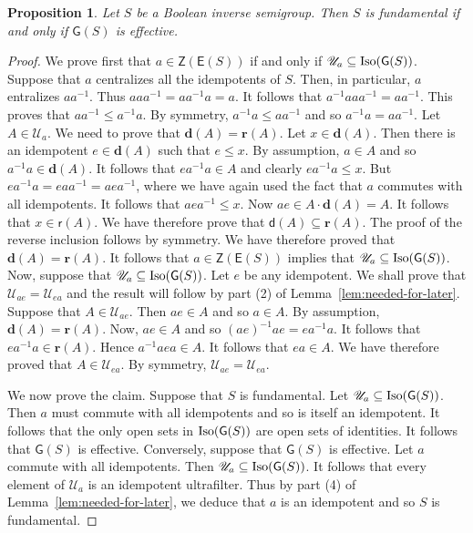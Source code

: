 \documentclass[a4paper]{amsart}
\newtheorem{proposition}[theorem]{Proposition}
\begin{document}
\begin{proposition}\label{prop:effective} Let $S$ be a Boolean inverse semigroup.
Then $S$ is fundamental if and only if $\mathsf{G}(S)$ is effective.
\end{proposition}
\begin{proof} We prove first that $a \in \mathsf{Z}(\mathsf{E}(S))$ if and only if 
$\mathscr{U}_{a} \subseteq \mbox{\rm Iso}(\mathsf{G}(S))$.
Suppose that $a$ centralizes all the idempotents of $S$.
Then, in particular, $a$ entralizes $aa^{-1}$.
Thus $aaa^{-1} = aa^{-1}a = a$.
It follows that $a^{-1}a aa^{-1} = aa^{-1}$.
This proves that $aa^{-1} \leq a^{-1}a$.
By symmetry, $a^{-1}a \leq aa^{-1}$ and so $a^{-1}a = aa^{-1}$.
Let $A \in \mathscr{U}_{a}$.
We need to prove that $\mathbf{d}(A) = \mathbf{r}(A)$.
Let $x \in \mathbf{d}(A)$.
Then there is an idempotent $e \in \mathbf{d}(A)$ such that $e \leq x$.
By assumption, $a \in A$ and so $a^{-1}a \in \mathbf{d}(A)$.
It follows that $ea^{-1}a \in A$ and clearly $ea^{-1}a \leq x$.
But $ea^{-1}a = eaa^{-1} = aea^{-1}$, where we have again used the fact that $a$ commutes with all idempotents.
It follows that $aea^{-1} \leq x$.
Now $ae \in A \cdot \mathbf{d}(A) = A$.
It follows that $x \in \mathsf{r}(A)$.
We have therefore prove that $\mathsf{d}(A) \subseteq \mathbf{r}(A)$.
The proof of the reverse inclusion follows by symmetry.
We have therefore proved that $\mathbf{d}(A) = \mathbf{r}(A)$.
It follows that 
$a \in \mathsf{Z}(\mathsf{E}(S))$ 
implies that $\mathscr{U}_{a} \subseteq \mbox{\rm Iso}(\mathsf{G}(S))$.
Now, suppose that $\mathscr{U}_{a} \subseteq \mbox{\rm Iso}(\mathsf{G}(S))$.
Let $e$ be any idempotent.
We shall prove that $\mathscr{U}_{ae} = \mathscr{U}_{ea}$ and the result will follow by part (2) of
Lemma~\ref{lem:needed-for-later}.
Suppose that $A \in \mathscr{U}_{ae}$.
Then $ae \in A$ and so $a \in A$.
By assumption, $\mathbf{d}(A) = \mathbf{r}(A)$.
Now, $ae \in A$ and so $(ae)^{-1}ae =  ea^{-1}a$.
It follows that $ea^{-1}a \in \mathbf{r}(A)$.
Hence $a^{-1}aea \in A$.
It follows that $ea \in A$.
We have therefore proved that $A \in \mathscr{U}_{ea}$.
By symmetry, $\mathscr{U}_{ae} = \mathscr{U}_{ea}$.

We now prove the claim.
Suppose that $S$ is fundamental.
Let $\mathscr{U}_{a} \subseteq  \mbox{\rm Iso}(\mathsf{G}(S))$.
Then $a$ must commute with all idempotents and so is itself an idempotent.
It follows that the only open sets in $\mbox{\rm Iso}(\mathsf{G}(S))$
are open sets of identities.
It follows that $\mathsf{G}(S)$ is effective.
Conversely, suppose that $\mathsf{G}(S)$ is effective.
Let $a$ commute with all idempotents.
Then $\mathscr{U}_{a} \subseteq \mbox{\rm Iso}(\mathsf{G}(S))$.
It follows that every element of $\mathscr{U}_{a}$ is an idempotent ultrafilter.
Thus by part (4) of Lemma~\ref{lem:needed-for-later}, we deduce that $a$ is an idempotent
and so $S$ is fundamental.
\end{proof}
\end{document}
